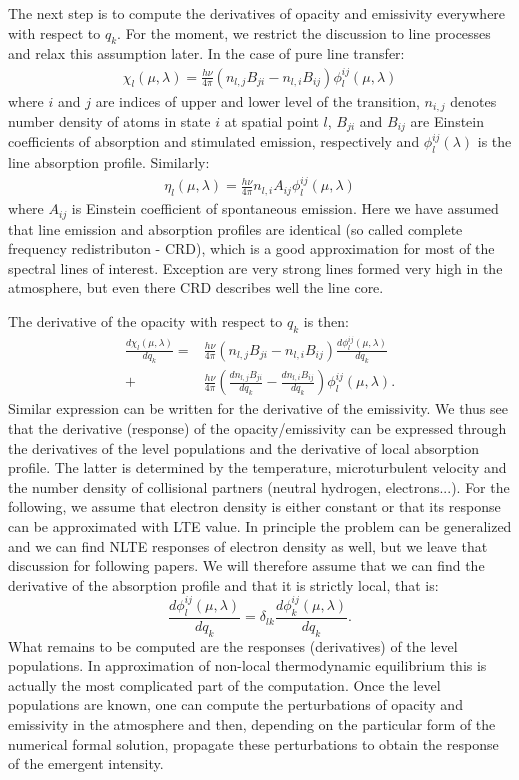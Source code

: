 \documentclass[referee]{aa}
\begin{document}
The next step is to compute the derivatives of opacity and emissivity everywhere with respect to $q_k$. For the moment, we restrict the discussion to line processes and relax this assumption later. In the case of pure line transfer:
\begin{align}
 \chi_l(\mu,\lambda) = \frac{h\nu}{4\pi}(n_{l,j} B_{ji} - n_{l,i}B_{ij}) \phi^{ij}_l(\mu,\lambda) 
\end{align}
where $i$ and $j$ are indices of upper and lower level of the transition, $n_{i,j}$ denotes number density of atoms in state $i$ at spatial point $l$, $B_{ji}$ and $B_{ij}$ are Einstein coefficients of absorption and stimulated emission, respectively and $\phi^{ij}_l(\lambda)$ is the line absorption profile. Similarly:
\begin{align}
 \eta_l(\mu,\lambda) = \frac{h\nu}{4\pi}n_{l,i}A_{ij} \phi^{ij}_l(\mu,\lambda) 
\end{align}
where $A_{ij}$ is Einstein coefficient of spontaneous emission. Here we have assumed that line emission and absorption profiles are identical (so called complete frequency redistributon - CRD), which is a good approximation for most of the spectral lines of interest. Exception are very strong lines formed very high in the atmosphere, but even there CRD describes well the line core.

The derivative of the opacity with respect to $q_k$ is then:
\begin{align}
  \frac{d \chi_l(\mu,\lambda)}{d q_k} = & \frac{h\nu}{4\pi}(n_{l,j} B_{ji} - n_{l,i}B_{ij}) \frac{d\phi^{ij}_l(\mu,\lambda)}{d q_k} \nonumber \\
 + & \frac{h\nu}{4\pi}(\frac{d n_{l,j} B_{ji}}{d q_k} - \frac{d n_{l,i}B_{ij}}{d q_k}) \phi^{ij}_l(\mu,\lambda).
 \label{chi_derivative}
\end{align}
Similar expression can be written for the derivative of the emissivity. We thus see that the derivative (response) of the opacity/emissivity can be expressed through the derivatives of the level populations and the derivative of local absorption profile. The latter is determined by the temperature, microturbulent velocity and the number density of collisional partners (neutral hydrogen, electrons...). For the following, we assume that electron density is either constant or that its response can be approximated with LTE value. In principle the problem can be generalized and we can find NLTE responses of electron density as well, but we leave that discussion for following papers. We will therefore assume that we can find the derivative of the absorption profile and that it is strictly local, that is:
\begin{equation}
 \frac{d\phi^{ij}_l(\mu,\lambda)}{d q_k} = \delta_{lk} \frac{d\phi^{ij}_k(\mu,\lambda)}{d q_k}.
\end{equation}
What remains to be computed are the responses (derivatives) of the level populations. In approximation of non-local thermodynamic equilibrium this is actually the most complicated part of the computation. Once the level populations are known, one can compute the perturbations of opacity and emissivity in the atmosphere and then, depending on the particular form of the numerical formal solution, propagate these perturbations to obtain the response of the emergent intensity.
\end{document}
